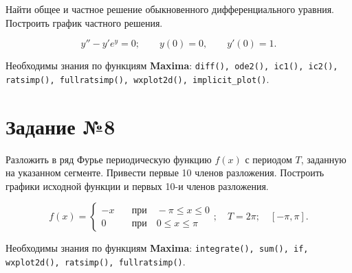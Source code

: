     Найти общее и частное решение обыкновенного дифференциального уравния. Построить график частного решения.

    \[
        y'' - y' e^{y} = 0; \qquad y(0) = 0, \qquad y'(0) = 1.
    \]

    Необходимы знания по функциям \textbf{Maxima}: {\tt diff(), ode2(), ic1(), ic2(), ratsimp(), fullratsimp(), wxplot2d(), implicit\_plot()}.

\section*{Задание №8}
    
    Разложить в ряд Фурье периодическую функцию $f(x)$ с периодом $T$, заданную на указанном сегменте. Привести первые 10 членов разложения. Построить графики исходной функции и первых 10-и членов разложения.

    \[
        f(x) =
            \begin{cases}
                - x \quad &\mbox{при} \quad -\pi \leq x \leq 0\\
                0 \quad &\mbox{при} \quad 0 \leq x \leq \pi
            \end{cases}; \quad T = 2 \pi; \quad [-\pi, \pi].
    \]

    Необходимы знания по функциям \textbf{Maxima}: {\tt integrate(), sum(), if, wxplot2d(), ratsimp(), fullratsimp()}.
